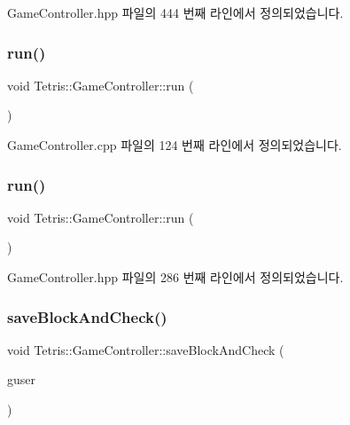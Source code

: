 Game\+Controller.\+hpp 파일의 444 번째 라인에서 정의되었습니다.

\mbox{\label{class_tetris_1_1_game_controller_a49446695e3ba0ff829f20beaeecac6da}} 
\subsubsection{\texorpdfstring{run()}{run()}\hspace{0.1cm}{\footnotesize\ttfamily [1/2]}}
{\footnotesize\ttfamily void Tetris\+::\+Game\+Controller\+::run (\begin{DoxyParamCaption}{ }\end{DoxyParamCaption})}



Game\+Controller.\+cpp 파일의 124 번째 라인에서 정의되었습니다.

\mbox{\label{class_tetris_1_1_game_controller_a49446695e3ba0ff829f20beaeecac6da}} 
\subsubsection{\texorpdfstring{run()}{run()}\hspace{0.1cm}{\footnotesize\ttfamily [2/2]}}
{\footnotesize\ttfamily void Tetris\+::\+Game\+Controller\+::run (\begin{DoxyParamCaption}{ }\end{DoxyParamCaption})\hspace{0.3cm}{\ttfamily [inline]}}



Game\+Controller.\+hpp 파일의 286 번째 라인에서 정의되었습니다.

\mbox{\label{class_tetris_1_1_game_controller_a3c63a9754e4cbeae4f66a5760bb4055d}} 
\subsubsection{\texorpdfstring{save\+Block\+And\+Check()}{saveBlockAndCheck()}\hspace{0.1cm}{\footnotesize\ttfamily [1/2]}}
{\footnotesize\ttfamily void Tetris\+::\+Game\+Controller\+::save\+Block\+And\+Check (\begin{DoxyParamCaption}\item[{\hyperlink{class_tetris_1_1_users_1_1_game_user}{Users\+::\+Game\+User} $\ast$}]{guser }\end{DoxyParamCaption})}




